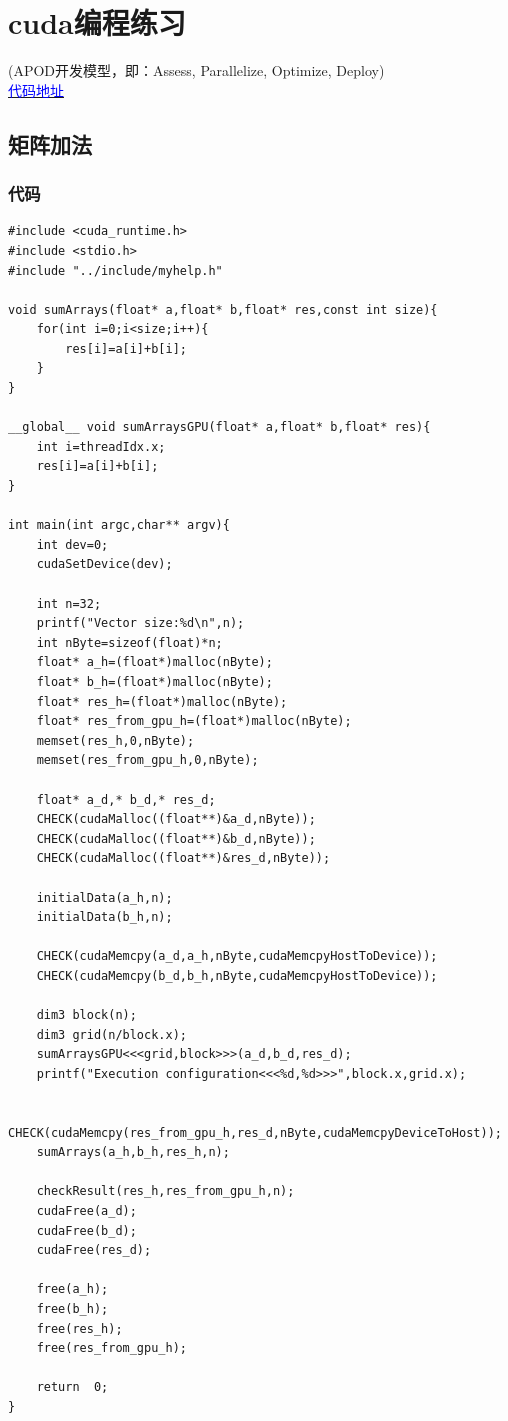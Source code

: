 \section{cuda编程练习}
\noindent
(APOD开发模型，即：Assess, Parallelize, Optimize, Deploy)\\
\underline{\href{https://github.com/buyizhiyou/cuda-tutorial}{\textcolor{blue}{代码地址}}}





\subsection{矩阵加法}
\subsubsection{代码}
\begin{lstlisting}
#include <cuda_runtime.h>
#include <stdio.h>
#include "../include/myhelp.h"

void sumArrays(float* a,float* b,float* res,const int size){
	for(int i=0;i<size;i++){
		res[i]=a[i]+b[i];
	}
}

__global__ void sumArraysGPU(float* a,float* b,float* res){
	int i=threadIdx.x;
	res[i]=a[i]+b[i];
}

int main(int argc,char** argv){
	int dev=0;
	cudaSetDevice(dev);
	
	int n=32;
	printf("Vector size:%d\n",n);
	int nByte=sizeof(float)*n;
	float* a_h=(float*)malloc(nByte);
	float* b_h=(float*)malloc(nByte);
	float* res_h=(float*)malloc(nByte);
	float* res_from_gpu_h=(float*)malloc(nByte);
	memset(res_h,0,nByte);
	memset(res_from_gpu_h,0,nByte);
	
	float* a_d,* b_d,* res_d;
	CHECK(cudaMalloc((float**)&a_d,nByte));
	CHECK(cudaMalloc((float**)&b_d,nByte));
	CHECK(cudaMalloc((float**)&res_d,nByte));
	
	initialData(a_h,n);
	initialData(b_h,n);
	
	CHECK(cudaMemcpy(a_d,a_h,nByte,cudaMemcpyHostToDevice));
	CHECK(cudaMemcpy(b_d,b_h,nByte,cudaMemcpyHostToDevice));
	
	dim3 block(n);
	dim3 grid(n/block.x);
	sumArraysGPU<<<grid,block>>>(a_d,b_d,res_d);
	printf("Execution configuration<<<%d,%d>>>",block.x,grid.x);

	CHECK(cudaMemcpy(res_from_gpu_h,res_d,nByte,cudaMemcpyDeviceToHost));
	sumArrays(a_h,b_h,res_h,n);
	
	checkResult(res_h,res_from_gpu_h,n);
	cudaFree(a_d);
	cudaFree(b_d);
	cudaFree(res_d);
	
	free(a_h);
	free(b_h);
	free(res_h);
	free(res_from_gpu_h);
	
	return  0;
}


\end{lstlisting}

